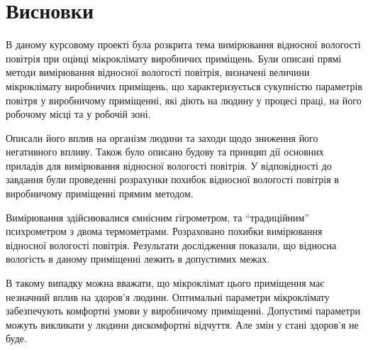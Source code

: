 \chapter*{Висновки}

В даному курсовому проекті була розкрита тема вимірювання відносної вологості повітрія при оцінці
мікроклімату виробничих приміщень. Були описані прямі методи вимірювання відносної вологості
повітрія, визначені величини мікроклімату виробничих приміщень, що характеризується сукупністю
параметрів повітря у виробничому приміщенні, які діють на людину у процесі праці, на його робочому
місці та у робочій зоні.

Описали його вплив на організм людини та заходи щодо зниження його негативного впливу. Також було
описано будову та принцип дії основних приладів для вимірювання відносної вологості повітрія.  У
відповідності до завдання були проведенні розрахунки похибок відносної вологості повітрія в
виробничому приміщенні прямим методом.

Вимірювання здійснювалися ємнісним гігрометром, та ``традиційним'' психрометром з двома
термометрами. Розраховано похибки вимірювання відносної вологості повітрія. Результати дослідження
показали, що відносна вологість в даному приміщенні лежить в допустимих межах.

В такому випадку можна вважати, що мікроклімат цього приміщення має незначний вплив на здоров’я
людини.  Оптимальні параметри мікроклімату забезпечують комфортні умови у виробничому
приміщенні. Допустимі параметри можуть викликати у людини дискомфортні відчуття. Але змін у стані
здоров'я не буде.
